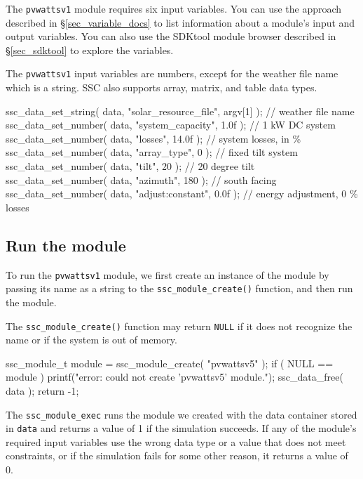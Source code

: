 \documentclass{scrartcl} %
\begin{document}
The \texttt{pvwattsv1} module requires six input variables. You can use the approach described in \S\ref{sec_variable_docs} to list information about a module's input and output variables. You can also use the SDKtool module browser described in \S\ref{sec_sdktool} to explore the variables.

The \texttt{pvwattsv1} input variables are numbers, except for the weather file name which is a string. SSC also supports array, matrix, and table data types.

\begin{verbatimtab}[4]
	ssc_data_set_string( data, "solar_resource_file", argv[1] ); // weather file name
	ssc_data_set_number( data, "system_capacity", 1.0f );  // 1 kW DC system
	ssc_data_set_number( data, "losses", 14.0f );      // system losses, in \%
	ssc_data_set_number( data, "array_type", 0 );      // fixed tilt system
	ssc_data_set_number( data, "tilt", 20 );           // 20 degree tilt
	ssc_data_set_number( data, "azimuth", 180 );       // south facing
	ssc_data_set_number( data, "adjust:constant", 0.0f ); // energy adjustment, 0 \% losses
\end{verbatimtab}

\subsection{Run the module}
\label{sec_run_module}

To run the \texttt{pvwattsv1} module, we first create an instance of the module by passing its name as a string to the \texttt{ssc\_module\_create()} function, and then run the module. 

The \texttt{ssc\_module\_create()} function may return \texttt{NULL} if it does not recognize the name or if the system is out of memory.

\begin{verbatimtab}[4]
	ssc_module_t module = ssc_module_create( "pvwattsv5" );
	if ( NULL == module )
	{
		printf("error: could not create 'pvwattsv5' module.\n");
		ssc_data_free( data );
		return -1;
	}
\end{verbatimtab}

The \texttt{ssc\_module\_exec} runs the module we created with the data container stored in \texttt{data} and returns a value of 1 if the simulation succeeds. If any of the module's required input variables use the wrong data type or a value that does not meet constraints, or if the simulation fails for some other reason, it returns a value of 0.
\end{document}
